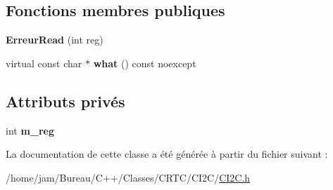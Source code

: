 \subsection*{Fonctions membres publiques}
\begin{DoxyCompactItemize}
\item 
\hypertarget{classCI2C_1_1ErreurRead_a2006046ac1989f7d8f36e73365a7430d}{{\bfseries Erreur\+Read} (int reg)}\label{classCI2C_1_1ErreurRead_a2006046ac1989f7d8f36e73365a7430d}

\item 
\hypertarget{classCI2C_1_1ErreurRead_a43289e1f3f662de4ee81036a98b2ed55}{virtual const char $\ast$ {\bfseries what} () const noexcept}\label{classCI2C_1_1ErreurRead_a43289e1f3f662de4ee81036a98b2ed55}

\end{DoxyCompactItemize}
\subsection*{Attributs privés}
\begin{DoxyCompactItemize}
\item 
\hypertarget{classCI2C_1_1ErreurRead_a8af2c5a4b9b952aa97537fd2c59745a5}{int {\bfseries m\+\_\+reg}}\label{classCI2C_1_1ErreurRead_a8af2c5a4b9b952aa97537fd2c59745a5}

\end{DoxyCompactItemize}


La documentation de cette classe a été générée à partir du fichier suivant \+:\begin{DoxyCompactItemize}
\item 
/home/jam/\+Bureau/\+C++/\+Classes/\+C\+R\+T\+C/\+C\+I2\+C/\hyperlink{CI2C_8h}{C\+I2\+C.\+h}\end{DoxyCompactItemize}
